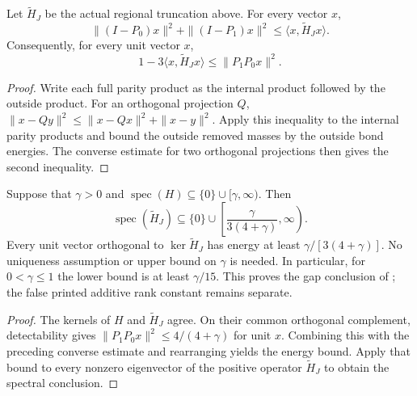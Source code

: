 \begin{lemma}
    \label{lem:physical_ff_truncated_converse}
    \leanok
    Let $\widetilde H_J$ be the actual regional truncation above.
    For every vector $x$,
    \[
        \|(I-P_0)x\|^2+\|(I-P_1)x\|^2
        \le\langle x,\widetilde H_Jx\rangle.
    \]
    Consequently, for every unit vector $x$,
    \[
        1-3\langle x,\widetilde H_Jx\rangle
        \le\|P_1P_0x\|^2.
    \]
\end{lemma}
\begin{proof}\leanok
    Write each full parity product as the internal product followed by
    the outside product. For an orthogonal projection $Q$,
    $\|x-Qy\|^2\le\|x-Qx\|^2+\|x-y\|^2$.
    Apply this inequality to the internal parity products and bound
    the outside removed masses by the outside bond energies.
    The converse estimate for two orthogonal projections then gives
    the second inequality.
\end{proof}

\begin{lemma}
    \label{thm:physical_ff_regional_gap}
    \leanok
    Suppose that $\gamma>0$ and
    $\operatorname{spec}(H)\subseteq\{0\}\cup[\gamma,\infty)$.
    Then
    \[
        \operatorname{spec}(\widetilde H_J)
        \subseteq\{0\}\cup
        \left[\frac{\gamma}{3(4+\gamma)},\infty\right).
    \]
    Every unit vector orthogonal to $\ker\widetilde H_J$ has energy
    at least $\gamma/[3(4+\gamma)]$.
    No uniqueness assumption or upper bound on $\gamma$ is needed.
    In particular, for $0<\gamma\le1$ the lower bound is at least
    $\gamma/15$. This proves the gap conclusion of
    \cite[Section 6.1]{Arad2016RigorousRG}; the false printed
    additive rank constant remains separate.
\end{lemma}
\begin{proof}\leanok
    The kernels of $H$ and $\widetilde H_J$ agree. On their common
    orthogonal complement, detectability gives
    $\|P_1P_0x\|^2\le4/(4+\gamma)$ for unit $x$.
    Combining this with the preceding converse estimate and rearranging
    yields the energy bound. Apply that bound to every nonzero
    eigenvector of the positive operator $\widetilde H_J$ to obtain
    the spectral conclusion.
\end{proof}
